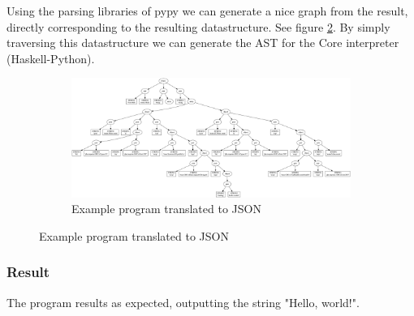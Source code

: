 Using the parsing libraries of pypy we can generate a nice graph from the result,
directly corresponding to the resulting datastructure. 
See figure \ref{fig:helloworldgraph}.
By simply traversing this datastructure we can generate the AST for the Core 
interpreter (Haskell-Python).

\begin{figure}
\begin{figure}[H]
\includegraphics[width=\textwidth]{../interpreter/tests/helloworld.png}
\caption{Example program translated to JSON}
\label{fig:helloworldgraph}
\end{figure}
\end{figure}

\subsubsection{Result}

The program results as expected, outputting the string "Hello, world!".

